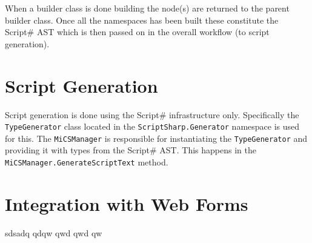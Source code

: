 	When a builder class is done building the node(s) are returned to the parent builder class. Once all the namespaces has been built these constitute the Script\# AST which is then passed on in the overall workflow (to script generation).

\section{Script Generation} %
\label{sec:script_generation}
	Script generation is done using the Script\# infrastructure only. Specifically the \texttt{TypeGenerator} class located in the \texttt{ScriptSharp.Generator} namespace is used for this. The \texttt{MiCSManager} is responsible for instantiating the \texttt{TypeGenerator} and providing it with types from the Script\# AST. This happens in the \texttt{MiCSManager.GenerateScriptText} method.

\section{Integration with Web Forms} %
\label{sec:integration_with_web_forms}
	sdsadq qdqw qwd qwd qw 
